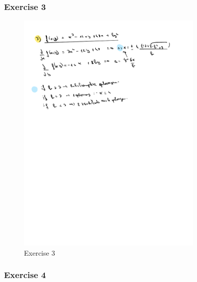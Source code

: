\documentclass[a4paper]{report}
\begin{document}
\subsubsection{Exercise 3}

\begin{figure}[H]
	\centering
	\includegraphics[width=0.8\textwidth]{assets/huis_4_ex_3.pdf}
	\caption{Exercise 3}
\end{figure}

\subsubsection{Exercise 4}
\end{document}
